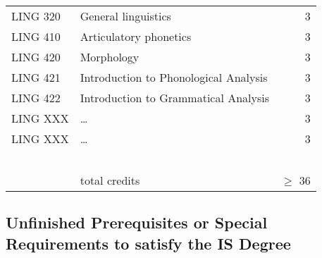 \documentclass[11pt,oneside]{article}
\begin{document}
\begin{table}[h]
\begin{tabular}{llr}
LING 320 &	General linguistics	& 3\\
LING 410 &	Articulatory phonetics	& 3\\
LING 420 &	Morphology	& 3\\
LING 421 &	Introduction to Phonological Analysis	& 3\\
LING 422 &	Introduction to Grammatical Analysis	& 3\\

LING XXX & \dots &	3\\
LING XXX & \dots &	3\\
		

	
& & \\
& & \\
& & \\
& & \\
& & \\
	
\hline		
&	\hfill total credits	& $\geq$ 36\\

\end{tabular}
\end{table}

\subsection*{Unfinished Prerequisites or Special Requirements to satisfy the IS Degree}
\end{document}
